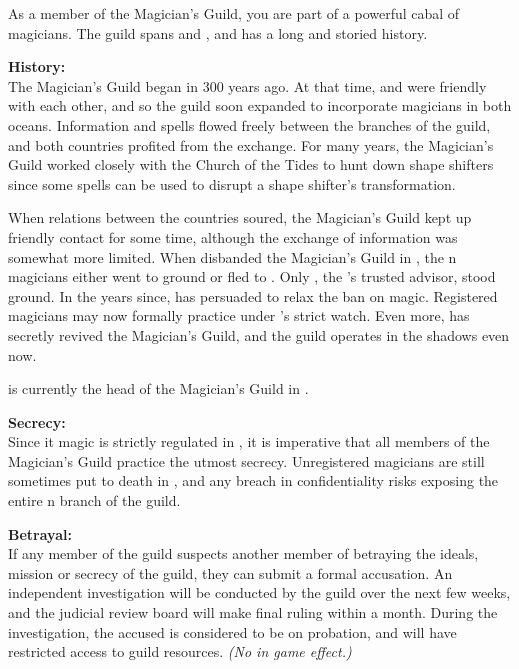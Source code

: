 \documentclass[blue]{NeptuneBall}
\begin{document}
\name{\bMagician{}}

As a member of the Magician's Guild, you are part of a powerful cabal of magicians. The guild spans \pAtlantis{} and \pPacifica{}, and has a long and storied history.

{\bf History:}\\
The Magician's Guild began in \pAtlantis{} 300 years ago. At that time, \pAtlantis{} and \pPacifica{} were friendly with each other, and so the guild soon expanded to incorporate magicians in both oceans. Information and spells flowed freely between the branches of the guild, and both countries profited from the exchange. For many years, the Magician's Guild worked closely with the Church of the Tides to hunt down shape shifters since some spells can be used to disrupt a shape shifter's transformation.

When relations between the countries soured, the Magician's Guild kept up friendly contact for some time, although the exchange of information was somewhat more limited. When \cKing{\King} \cKing{} disbanded the Magician's Guild in \pAtlantis{}, the \pAtlantis{}n magicians either went to ground or fled to \pPacifica{}. Only \cManta{}, the \cKing{\King}'s trusted advisor, stood \cManta{\their} ground. In the years since, \cManta{} has persuaded \cKing{} to relax the ban on magic. Registered magicians may now formally practice under \cManta{}'s strict watch. Even more, \cManta{} has secretly revived the Magician's Guild, and the guild operates in the shadows even now.

\cManta{} is currently the head of the Magician's Guild in \pAtlantis{}.

{\bf Secrecy:}\\
Since it magic is strictly regulated in \pAtlantis{}, it is imperative that all members of the Magician's Guild practice the utmost secrecy. Unregistered magicians are still sometimes put to death in \pAtlantis{}, and any breach in confidentiality risks exposing the entire \pAtlantis{}n branch of the guild.

{\bf Betrayal:}\\
If any member of the guild suspects another member of betraying the ideals, mission or secrecy of the guild, they can submit a formal accusation. An independent investigation will be conducted by the guild over the next few weeks, and the judicial review board will make final ruling within a month. During the investigation, the accused is considered to be on probation, and will have restricted access to guild resources. \emph{(No in game effect.)}
\end{document}

